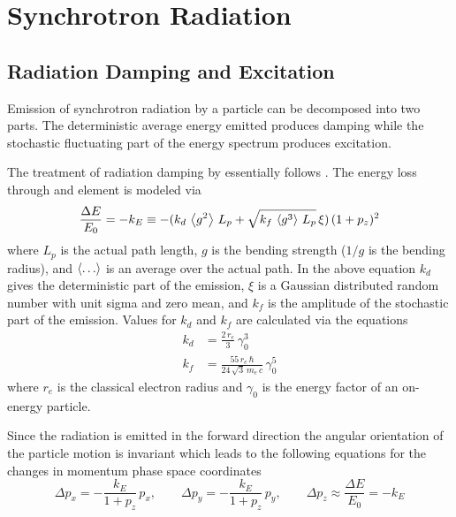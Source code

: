 \chapter{Synchrotron Radiation}

\section{Radiation Damping and Excitation}
\label{s:radiation}

Emission of synchrotron radiation by a particle can be decomposed into two parts. The deterministic
average energy emitted produces damping while the stochastic fluctuating part of the energy spectrum
produces excitation\cite{b:jowett}.

The treatment of radiation damping by \bmad essentially follows \mad. The energy loss through and
element is modeled via
\begin{equation}
  \frac{\Delta E}{E_0} = 
  -k_E \equiv -(k_d \, \left\langle g^2 \right\rangle \, L_p + \sqrt{k_f \, \left\langle g^3 \right\rangle \, L_p} \, \xi) \, (1 + p_z)^2
\end{equation}
where $L_p$ is the actual path length, $g$ is the bending strength ($1/g$ is the bending radius),
and $\left\langle \ldots \right\rangle$ is an average over the actual path.  In the above equation $k_d$ gives the
deterministic part of the emission, $\xi$ is a Gaussian distributed random number with unit sigma
and zero mean, and $k_f$ is the amplitude of the stochastic part of the emission. Values for $k_d$
and $k_f$ are calculated via the equations
\begin{align}
  k_d &= \frac{2 \, r_e}{3} \, \gamma_0^3
    \label{k2r3g} \\
  k_f &= \frac{55 \, r_e \, \hbar}{24 \, \sqrt{3} \, m_e \, c} \, \gamma_0^5
    \label{k55rh}
\end{align}
where $r_e$ is the classical electron radius and $\gamma_0$ is the energy factor of an on-energy
particle.

Since the radiation is emitted in the forward direction the angular orientation of the particle
motion is invariant which leads to the following equations for the changes in momentum phase space
coordinates
\begin{equation}
  \Delta p_x = -\frac{k_E}{1 + p_z} \, p_x , \qquad
  \Delta p_y = -\frac{k_E}{1 + p_z} \, p_y, \qquad
  \Delta p_z \approx \frac{\Delta E}{E_0} = -k_E 
  \label{pk1pp}
\end{equation}

